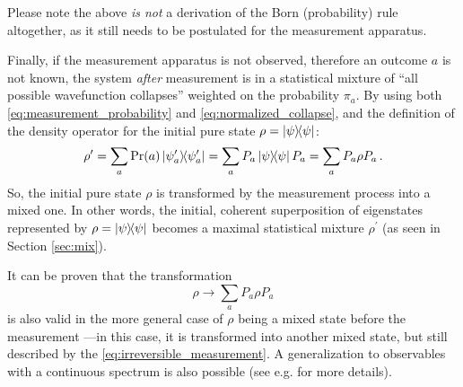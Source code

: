 Please note the above \emph{is not} a derivation of the Born (probability) rule altogether,
as it still needs to be postulated for the measurement apparatus.

Finally, if the measurement apparatus is not observed,
therefore an outcome $a$ is not known,
the system \emph{after} measurement is in a statistical mixture
of ``all possible wavefunction collapses'' weighted on the probability $\pi_{a}$.
By using both \eqref{eq:measurement_probability} and \eqref{eq:normalized_collapse},
and the definition of the density operator for the initial pure state
$\rho = \ketbra{\psi}$:
\[
  \rho^{\prime} = \sum_a \Pr(a) \ketbra{\psi^{\prime}_a} = \sum_a P_a \ketbra{\psi} P_a
    = \sum_a P_a \rho P_a \,\text{.}
\]
So, the initial pure state $\rho$ is transformed by the measurement process into a mixed one.
In other words, the initial, coherent superposition of eigenstates represented by $\rho = \ketbra{\psi}$
becomes a maximal statistical mixture $\rho^{\prime}$
(as seen in Section \ref{sec:mix}).

It can be proven that the transformation
\begin{equation}\label{eq:irreversible_measurement}
  \rho \rightarrow \sum_a P_a \rho P_a
\end{equation}
is also valid in the more general case of $\rho$ being a mixed state before the measurement
---in this case, it is transformed into another mixed state,
but still described by the \eqref{eq:irreversible_measurement}.
A generalization to observables with a continuous spectrum is also possible
(see e.g. \cite[.1]{PreskillNotes} for more details).

